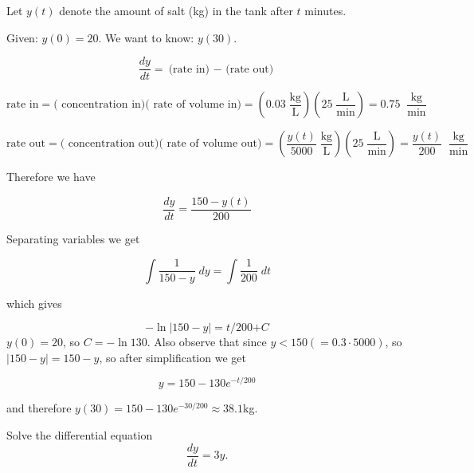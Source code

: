 \begin{solution}
Let $y(t)$ denote the amount of salt (kg) in the tank after $t$ minutes.

{Given: $y(0) =  {20.}$} {We want to know: $ {y(30).}$}

 
\[
\frac{d  y}{d t} = \textrm{(rate in) $-$ (rate out)}%
\]


\[
\textrm{rate in} = \textrm{( {concentration in})( {rate of volume in})}%
=\left( { {0.03\; \frac{\textrm{kg}}{\textrm{L}}}}\right)\left( { {25\; \frac{\textrm{L}}{\textrm{min}}}}\right)%
 { = }  
0.75\;\; \frac{\textrm{kg}}{\textrm{min}}%
\]

\[
\textrm{rate out}%
  = \textrm{( {concentration out})( {rate of volume out})}%
=\left( { {\frac{y(t)}{5000}\; \frac{\textrm{kg}}{\textrm{L}}}}\right)\left( { {25\; \frac{\textrm{L}}{\textrm{min}}}}\right)%
 =\frac{y(t)}{200} \;\; \frac{\textrm{kg}}{\textrm{min}}%
\]

Therefore we have 

\[
\frac{dy}{dt}= \frac{150 - y(t)}{200} 
\]

Separating variables we get

\[
\int \frac{1}{150-y} \; dy =\int \frac{1}{200}\; dt 
\]

which gives

\[
-\ln |150 - y| = t /200 {+ C}%
\]
 $ y(0) = 20 $,  so   $ C = {-\ln 130} $. Also observe that since $ y<150 (= 0.3\cdot 5000)$, so $ |150-y|=150-y$,  so after simplification we get


\[
y=150 - 130e^{-t/200}
\]

and therefore $ y(30)=150 - 130e^{-30/200} \approx 38.1 $kg.
\end{solution}








\begin{example}{}{}
Solve the differential equation
$$\frac{dy}{dt} =3y.$$
\end{example}


